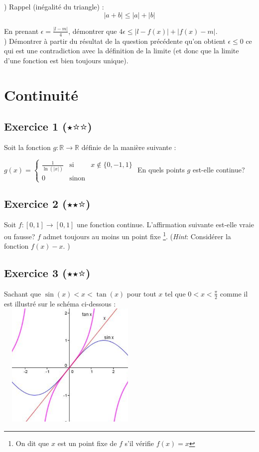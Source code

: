 \documentclass{article}
\newcommand{\R}{\mathbb{R}}
\begin{document}
) Rappel (inégalité du triangle) : 
$$\lvert a + b \rvert \leq \lvert a \rvert + \lvert b \rvert $$

\noindent En prenant $\epsilon = \frac{\lvert l - m \rvert}{4}$, démontrer que $4\epsilon \leq \lvert l - f(x) \rvert + \lvert f(x) - m \rvert $.\\

) Démontrer à partir du résultat de la question précédente qu'on obtient $\epsilon \leq 0$ ce qui est une contradiction avec la définition de la limite (et donc que la limite d'une fonction est bien toujours unique).

\section{Continuité}

\subsection*{Exercice 1 ($\medblackstar \medwhitestar \medwhitestar$)}
\noindent Soit la fonction $g: \R \to \R$ définie de la manière suivante : \newline

$g(x)=\left \{
\begin{array}{rcl}
\frac{1}{\ln(\vert x \vert)} & \text{si} &x \not\in \{0,-1,1\} \\
0 &\text{sinon}&
\end{array}
\right.$
En quels points $g$ est-elle continue?
\subsection*{Exercice 2 ($\medblackstar \medblackstar \medwhitestar$)}%
\noindent Soit $f:[0,1] \to [0,1]$ une fonction continue. L'affirmation suivante est-elle vraie ou fausse?\newline
$f$ admet toujours au moins un point fixe  
\footnote{On dit que $x$ est un point fixe de $f$ s'il vérifie $f(x)=x$}.\newline
(\textit{Hint}: Considérer la fonction $f(x)-x$. )

\subsection*{Exercice 3 ($\medblackstar \medblackstar \medwhitestar$)}
Sachant que $\sin(x) < x < \tan(x)$ pour tout $x$ tel que $0 < x < \frac{\pi}{2}$ comme il est illustré sur le schéma ci-dessous :\\
\includegraphics[width=7cm, height=6cm]{xsinxtanx.png}\\
\end{document}
